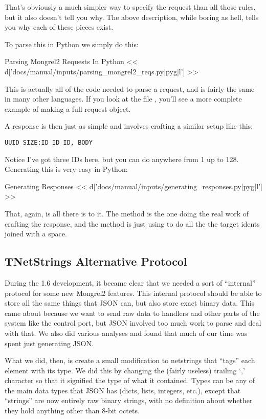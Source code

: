 That's obviously a much simpler way to specify the request than all those
rules, but it also doesn't tell you why.  The above description, while
boring as hell, tells you why each of these pieces exist.

To parse this in Python we simply do this:

\begin{code}{Parsing Mongrel2 Requests In Python}
<< d['docs/manual/inputs/parsing_mongrel2_reqs.py|pyg|l'] >>
\end{code}

This is actually all of the code needed to parse a request, and is
fairly the same in many other languages.  If you look at the file
, you'll see a more complete
example of making a full request object.

A response is then just as simple and involves crafting a similar
setup like this:

\begin{Verbatim}
UUID SIZE:ID ID ID, BODY
\end{Verbatim}

Notice I've got three IDs here, but you can do anywhere from 1 up to 128.  Generating
this is very easy in Python:

\begin{code}{Generating Responses}
<< d['docs/manual/inputs/generating_responses.py|pyg|l'] >>
\end{code}

That, again, is all there is to it.  The  method is the
one doing the real work of crafting the response, and the 
method is just using  to do all the the target idents
joined with a space.

\subsection{TNetStrings Alternative Protocol}
During the 1.6 development, it became clear that we needed a sort of ``internal''
protocol for some new Mongrel2 features.  This internal protocol should be
able to store all the same things that JSON can, but also store exact binary
data.  This came about because we want to send raw data to handlers and
other parts of the system like the control port, but JSON involved too
much work to parse and deal with that.  We also did various analyses and
found that much of our time was spent just generating JSON.

What we did, then, is create a small modification to netstrings that ``tags''
each element with its type.  We did this by changing the (fairly useless)
trailing `,' character so that it signified the type of what it contained.
Types can be any of the main data types that JSON has (dicts, lists, integers, etc.),
except that ``strings'' are now entirely raw binary strings, with no
definition about whether they hold anything other than 8-bit octets.

